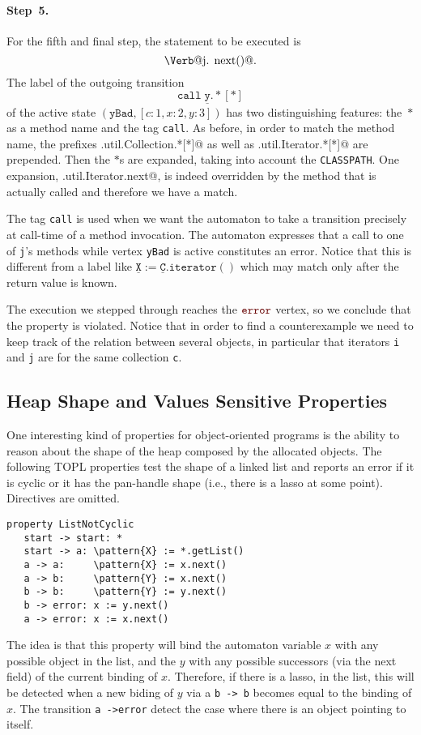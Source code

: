 \documentclass[9pt, preprint]{sigplanconf} %
\makeatletter
\newcommand{\delimitVerbatim}{\par\nobreak\smallskip\noindent}
\newcommand{\error}{\ensuremath{\textcolor{darkred}{\mathtt{error}}}\xspace}
\newcommand{\pattern}[1]{\ensuremath{\mathtt{\underline{#1}}}}
\newcommand{\verbline}[2][]{\[\text{\Verb@#2@}#1\]}
\theoremstyle{definition}
\theoremstyle{remark}
\makeatother
\begin{document}
\paragraph{Step~5.}

For the fifth and final step, the statement to be executed is \verbline[.]{j.\PY{n+na}{next}()}
The label of the outgoing transition  \[\mathtt{call}\;\pattern{y}.{*}[*]\] of the active state $(\texttt{yBad},[c:1,x:2,y:3])$
has two distinguishing features: the~$*$ as a method name and the tag \texttt{call}.
As before, in order to match the method name, the prefixes
\Verb@java.util.Collection.*[*]@ as well as \Verb@java.util.Iterator.*[*]@
are prepended.
Then the $*$s are expanded, taking into account the \texttt{CLASSPATH}.
One expansion, \Verb@java.util.Iterator.next@, is indeed
overridden by the method that is actually called and therefore 
we have a match.

The tag {\tt call} is used when we want the automaton to take a transition precisely at call-time of a method invocation.
The automaton expresses that a call to one of {\tt j}'s methods while vertex \texttt{yBad} is active constitutes an error.
Notice that this is different from a label like $\pattern X:=\pattern C.\mathtt{iterator}()$ which may match only after the return value is known.

\medskip
The execution we stepped through reaches the \error vertex, so we conclude that the property is violated.
Notice that in order to find a counterexample we need to keep track of the relation between several objects, in particular that iterators {\tt i} and {\tt j} are for the same collection {\tt c}.

\subsection{Heap Shape and Values Sensitive Properties}  %
One interesting kind of properties for object-oriented programs is the ability to reason about the shape of the heap composed by the allocated objects.
The following TOPL properties test the shape of a linked list and
reports an error if it is cyclic or it has the pan-handle shape (i.e.,
there is a lasso at some point). Directives are omitted.
%
\delimitVerbatim
\begin{Verbatim}[commandchars=\\\{\}]
 property ListNotCyclic
   start -> start: *
   start -> a: \pattern{X} := *.getList()
   a -> a:     \pattern{X} := x.next()
   a -> b:     \pattern{Y} := x.next()
   b -> b:     \pattern{Y} := y.next()
   b -> error: x := y.next()
   a -> error: x := x.next()
\end{Verbatim}
\delimitVerbatim
The idea is that this property will bind the automaton variable $x$ with any possible object in the list, and the $y$ with any possible successors (via the next field) of the current binding of $x$.
Therefore, if there is a lasso, in the list, this will be detected when a new biding of $y$ via a \texttt{b -> b} becomes equal to the binding of $x$.
The transition \texttt{a ->error} detect the case where there is an object pointing to itself.
\end{document}
